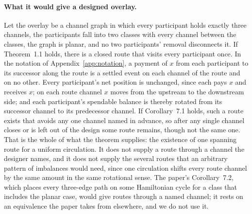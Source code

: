 \paragraph{What it would give a designed overlay.} Let the overlay be a channel graph in which every participant holds exactly three channels, the participants fall into two classes with every channel between the classes, the graph is planar, and no two participants' removal disconnects it. If Theorem~1.1 holds, there is a closed route that visits every participant once. In the notation of Appendix~\ref{app:notation}, a payment of $x$ from each participant to its successor along the route is a settled event on each channel of the route and on no other. Every participant's net position is unchanged, since each pays $x$ and receives $x$; on each route channel $x$ moves from the upstream to the downstream side; and each participant's spendable balance is thereby rotated from its successor channel to its predecessor channel. If Corollary~7.1 holds, such a route exists that avoids any one channel named in advance, so after any single channel closes or is left out of the design some route remains, though not the same one. That is the whole of what the theorem supplies: the existence of one spanning route for a uniform circulation. It does not supply a route through a channel the designer names, and it does not supply the several routes that an arbitrary pattern of imbalances would need, since one circulation shifts every route channel by the same amount in the same rotational sense. The paper's Corollary~7.2, which places every three-edge path on some Hamiltonian cycle for a class that includes the planar case, would give routes through a named channel; it rests on an equivalence the paper takes from elsewhere, and we do not use it.

